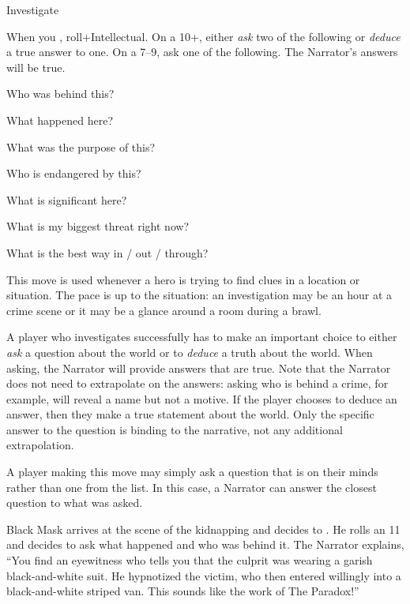 \begin{movedef}{Investigate}
  {
    \label{move:investigate}
    When you ,
    roll+Intellectual. On a 10+, either \emph{ask} two of the
    following or
    \emph{deduce} a true answer to one.  On a 7--9,
    ask one of the following. The Narrator's answers will be true.    
    \begin{choices}
    \item Who was behind this?
    \item What happened here?
    \item What was the purpose of this?
    \item Who is endangered by this?
    \item What is significant here?
    \item What is my biggest threat right now?
    \item What is the best way in / out / through?
    \end{choices}
    \onamiss{}
  }
  {
    This move is used whenever a hero is trying to find clues in 
    a location or situation. The pace is up to the situation:
    an investigation may be an hour at a crime scene or it may
    be a glance around a room during a brawl.

    A player who investigates successfully has to make an important
    choice to either \emph{ask} a question about the world
    or to \emph{deduce} a truth about the world.
    When asking, the Narrator will provide answers that are true.
    Note that the Narrator does not need to extrapolate on the
    answers: asking who is behind a crime, for example, will reveal
    a name but not a motive.
    If the player chooses to deduce an answer, then they make a
    true statement about the world. Only the specific answer to the
    question is binding to the narrative, not any additional
    extrapolation.

    A player making this move may simply ask a question that is on
    their minds rather than one from the list. In this case,
    a Narrator can answer the closest question to what was asked.

    \begin{example}
      Black Mask arrives at the scene of the kidnapping and decides
      to . He rolls an 11 and decides to ask
      what happened and who was behind it.
      The Narrator explains, ``You find an eyewitness who tells you
      that the culprit was wearing a garish black-and-white suit.
      He hypnotized the victim, who then entered willingly into
      a black-and-white striped van. This sounds like the work
      of The Paradox!''
    \end{example}

}
\end{movedef}
